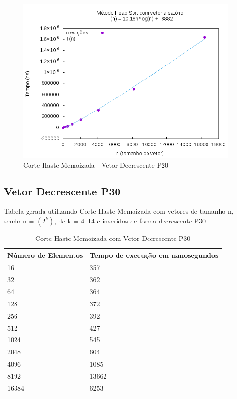 \documentclass[12pt,a4paper,twoside]{report}
\begin{document}
\begin{figure}[H]
    \centering
    \includegraphics[width=0.7\linewidth]{graficos/HeapSort/vIntAleatorio/vIntAleatorio.png}
  \caption{Corte Haste Memoizada - Vetor Decrescente P20}
\end{figure}



\subsection{Vetor Decrescente P30}
Tabela gerada utilizando Corte Haste Memoizada com vetores de tamanho n, sendo n = $(2^k)$, de k = 4..14 e inseridos de forma decrescente P30.
\begin{table}[H]
\centering
\caption{Corte Haste Memoizada com Vetor Decrescente P30}
\label{my-label}
\begin{tabular}{|l|l|}
\hline
\multicolumn{1}{|c|}{\textbf{Número de Elementos}} & \multicolumn{1}{c|}{\textbf{Tempo de execução em nanosegundos}} \\ \hline
16 & 357 \\ \hline
32 & 362 \\ \hline
64 & 364 \\ \hline
128 & 372 \\ \hline
256 & 392 \\ \hline
512 & 427 \\ \hline
1024 & 545 \\ \hline
2048 & 604 \\ \hline
4096 & 1085 \\ \hline
8192 & 13662 \\ \hline
16384 & 6253 \\ \hline
\end{tabular}
\end{table}
\end{document}
